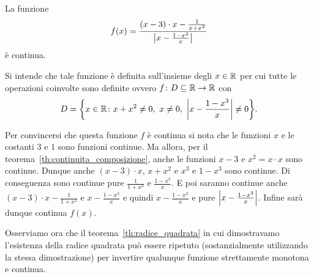 \begin{example}
La funzione
\[
f(x) = \frac{(x-3)\cdot x -\frac{1}{x+x^2}}{{\left|x-\frac{1-x^3}{x}\right|}}
\]
è continua.

Si intende che tale funzione è definita sull'insieme degli $x\in \mathbb R$
per cui tutte le operazioni coinvolte sono definite ovvero
$f\colon D \subseteq \mathbb R \to \mathbb R$
con
\[
  D = \ENCLOSE{x\in \RR \colon x+x^2 \neq 0,\ x\neq 0,\ \abs{x-\frac{1-x^3}{x}}\neq 0}.
\]

Per convincersi che questa funzione $f$ è continua
si nota che le funzioni $x$ e le costanti $3$ e $1$ sono
funzioni continue.
Ma allora, per il teorema~\ref{th:continuita_composizione},
anche le funzioni $x-3$ e $x^2=x\cdot x$ sono continue.
Dunque anche $(x-3)\cdot x$, $x+x^2$ e $x^3$ e $1-x^3$ sono continue.
Di conseguenza sono continue pure $\frac 1{1+x^2}$ e $\frac{1-x^3}{x}$.
E poi saranno continue anche $(x-3)\cdot x - \frac 1{1+x^2}$ e $x-\frac{1-x^3}{x}$
e quindi $x-\frac{1-x^3}{x}$ e pure ${\left|x-\frac{1-x^3}{x}\right|}$. Infine sarà
dunque continua $f(x)$.
\end{example}

Osserviamo ora che il teorema~\ref{th:radice_quadrata}
in cui dimostravamo l'esistenza della radice quadrata
può essere ripetuto (sostanzialmente utilizzando la stessa
dimostrazione) per invertire qualunque funzione
strettamente monotona e continua.

